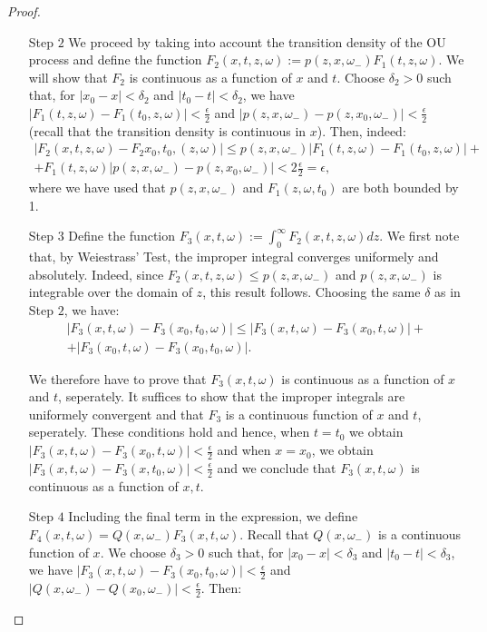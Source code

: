 \documentclass[11pt,reqno]{article}
\theoremstyle{definition}
\begin{document}
\begin{proof}
\begin{itemize}
		\item[Step $2$] We proceed by taking into account the transition density of the OU process and define the function $F_2(x,t,z,\omega):=p(z,x,\omega_-)F_1(t,z,\omega)$. We will show that $F_2$ is continuous as a function of $x$ and $t$. Choose $\delta_2 >0$ such that, for $|x_0-x|<\delta_2$ and $|t_0-t|<\delta_2$, we have $	|F_1(t,z,\omega)-F_1(t_0,z,\omega)| < \frac{\epsilon}{2}$ and $|p(z,x,\omega_-)-p(z,x_0,\omega_-)| < \frac{\epsilon}{2}$ (recall that the transition density is continuous in $x$). Then, indeed:
		\begin{eqnarray}
			|F_2(x,t,z,\omega)-F_2x_0,t_0,(z,\omega)| \leq p(z,x,\omega_-)|F_1(t,z,\omega)-F_1(t_0,z,\omega)| +\nonumber\\ +F_1(t,z,\omega)|p(z,x,\omega_-)-p(z,x_0,\omega_-)| < 2\frac{\epsilon}{2}=\epsilon,
		\end{eqnarray}
		where we have used that $p(z,x,\omega_-)$ and $F_1(z,\omega,t_0)$ are both bounded by 1.
		
		\item[Step $3$] Define the function $F_3(x,t,\omega):=\int_{0}^{\infty} F_2(x,t,z,\omega)dz$. We first note that, by Weiestrass' Test, the improper integral converges uniformely and absolutely. Indeed, since $F_2(x,t,z,\omega) \leq p(z,x,\omega_-)$ and $p(z,x,\omega_-)$ is integrable over the domain of $z$, this result follows. Choosing the same $\delta$ as in Step $2$, we have:
		\begin{eqnarray}
			|F_3(x,t,\omega)-F_3(x_0,t_0,\omega)| \leq | F_3(x,t,\omega)-F_3(x_0,t,\omega)| +\nonumber\\ +|F_3(x_0,t,\omega)-F_3(x_0,t_0,\omega)|.
		\end{eqnarray}
		
		
		We therefore have to prove that $F_3(x,t,\omega)$ is continuous as a function of $x$ and $t$, seperately. It suffices to show that the improper integrals are uniformely convergent and that $F_3$ is a continuous function of $x$ and $t$, seperately. These conditions hold and hence, when $t=t_0$ we obtain $| F_3(x,t,\omega)-F_3(x_0,t,\omega)| < \frac{\epsilon}{2}$ and when $x=x_0$, we obtain $|F_3(x,t,\omega)-F_3(x,t_0,\omega)|< \frac{\epsilon}{2}$ and we conclude that $F_3(x,t,\omega)$ is continuous as a function of $x,t$.
		
		\item[Step $4$] Including the final term in the expression, we define $F_4(x,t,\omega)=Q(x,\omega_-)F_3(x,t,\omega)$. Recall that $Q(x,\omega_-)$ is a continuous function of $x$. We choose $\delta_3 >0$ such that, for $|x_0-x|<\delta_3$ and $|t_0-t|<\delta_3$, we have $	|F_3(x,t,\omega)-F_3(x_0,t_0,\omega)| < \frac{\epsilon}{2}$ and $|Q(x,\omega_-)-Q(x_0,\omega_-)| < \frac{\epsilon}{2}$. Then:
		

\end{itemize}
\end{proof}
\end{document}
